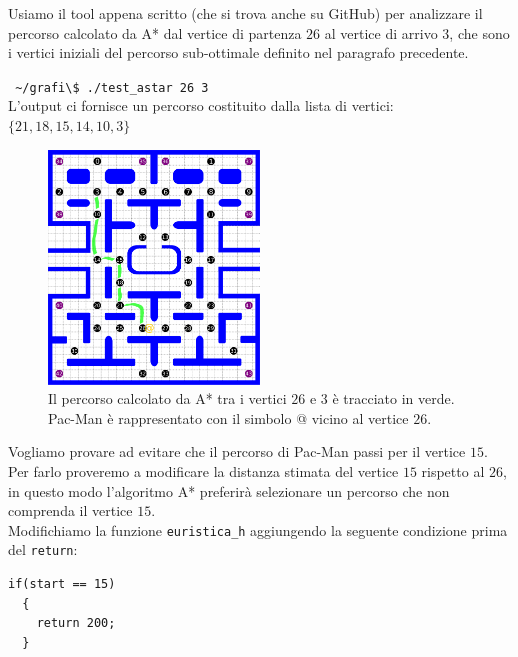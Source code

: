 \documentclass[8pt]{book}
\begin{document}
Usiamo il tool appena scritto (che si trova anche su GitHub) per analizzare il percorso calcolato da A* dal vertice di partenza $26$ al vertice di arrivo $3$, che sono i vertici iniziali del percorso sub-ottimale definito nel paragrafo precedente.

\texttt{
  \newline
\textasciitilde{}/grafi\textbackslash{}\$ ./test\_astar 26 3
}\\

L'output ci fornisce un percorso costituito dalla lista di vertici: $\{21,18,15,14,10,3\}$

\begin{figure}[H]
  \centering
  \includegraphics[width=0.5\textwidth]{img/Astar_1.png}
  \caption{Il percorso calcolato da A* tra i vertici $26$ e $3$ è tracciato in verde. Pac-Man è rappresentato con il simbolo @ vicino al vertice $26$.}
  \label{Astar_1}
\end{figure}

Vogliamo provare ad evitare che il percorso di Pac-Man passi per il vertice $15$. Per farlo proveremo a modificare la distanza stimata del vertice $15$ rispetto al $26$, in questo modo l'algoritmo A* preferirà selezionare un percorso che non comprenda il vertice $15$.\\
Modifichiamo la funzione \texttt{euristica\_h} aggiungendo la seguente condizione prima del \texttt{return}:

\begin{spacing}{0.9}
  \begin{small}
    \begin{tcolorbox}
\begin{verbatim}
if(start == 15)
  {
    return 200;
  }
\end{verbatim}
  \end{tcolorbox}
    \end{small}
      \end{spacing}
    
\end{document}
